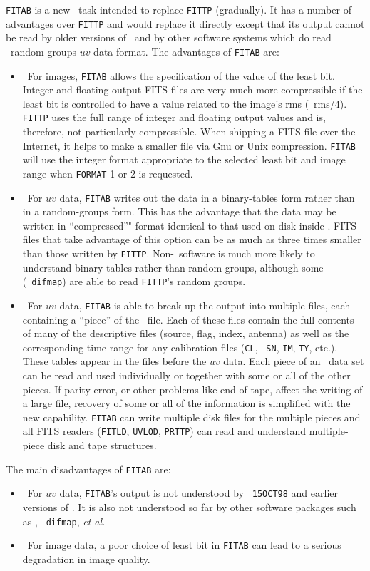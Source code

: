 {\tt FITAB} is a new \AIPS\ task intended to replace {\tt FITTP}
(gradually).  It has a number of advantages over {\tt FITTP} and would
replace it directly except that its output cannot be read by older
versions of \AIPS\ and by other software systems which do read \AIPS\
random-groups $uv$-data format.  The advantages of {\tt FITAB} are:
\begin{itemize}
\item\ For images, {\tt FITAB} allows the specification of the value of
   the least bit.  Integer and floating output FITS files are very much
   more compressible if the least bit is controlled to have a value
   related to the image's rms (\eg\ rms/4).  {\tt FITTP} uses the full
   range of integer and floating output values and is, therefore, not
   particularly compressible.  When shipping a FITS file over the
   Internet, it helps to make a smaller file via Gnu or Unix
   compression.  {\tt FITAB} will use the integer format appropriate
   to the selected least bit and image range when {\tt FORMAT} 1 or 2
   is requested.
\item\ For $uv$ data, {\tt FITAB} writes out the data in a
   binary-tables form rather than in a random-groups form.  This has
   the advantage that the data may be written in ``compressed''" format
   identical to that used on disk inside \AIPS\@.  FITS files that
   take advantage of this option can be as much as three times smaller
   than those written by {\tt FITTP}\@.  Non-\AIPS\ software is much
   more likely to understand binary tables rather than random groups,
   although some (\ie\ {\tt difmap}) are able to read {\tt FITTP}'s
   random groups.
\item\ For $uv$ data, {\tt FITAB} is able to break up the output into
   multiple files, each containing a ``piece'' of the \AIPS\ file.
   Each of these files contain the full contents of many of the
   descriptive files (source, flag, index, antenna) as well as the
   corresponding time range for any calibration files ({\tt CL}, {\tt
   SN}, {\tt IM}, {\tt TY}, etc.).  These tables appear in the files
   before the $uv$ data.  Each piece of an \AIPS\ data set can be read
   and used individually or together with some or all of the other
   pieces.  If parity error, or other problems like end of tape,
   affect the writing of a large file, recovery of some or all of the
   information is simplified with the new capability.  {\tt FITAB} can
   write multiple disk files for the multiple pieces and all FITS
   readers ({\tt FITLD}, {\tt UVLOD}, {\tt PRTTP}) can read and
   understand multiple-piece disk and tape structures.
\end{itemize}
The main disadvantages of {\tt FITAB} are:
\begin{itemize}
\item\ For $uv$ data, {\tt FITAB}'s output is not understood by {\tt
   15OCT98} and earlier versions of \AIPS\@.  It is also not
   understood so far by other software packages such as \AIPTOO, {\tt
   difmap}, {\it et al.}
\item\ For image data, a poor choice of least bit in {\tt FITAB} can
   lead to a serious degradation in image quality.
\end{itemize}

